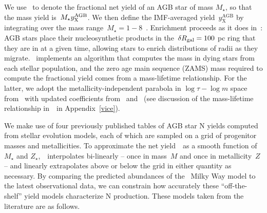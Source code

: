 We use~ to denote the fractional net yield of an AGB star of mass
$M_\star$, so that the mass yield is~$M_\star y_\text{X}^\text{AGB}$.
We then define the IMF-averaged yield~$y_\text{X}^\text{AGB}$ by integrating
over the mass range~$M_\star = 1 - 8$~\msun.
Enrichment proceeds as it does in~\citet{Johnson2021}: AGB stars place their
nucleosynthetic products in the~$\delta R_\text{gal} = 100$ pc ring that they are in at
a given time, allowing stars to enrich distributions of radii as they migrate.
\vice~implements an algorithm that computes the mass in dying stars
from each stellar population, and the zero age main sequence (ZAMS) mass
required to compute the fractional yield comes from a mass-lifetime
relationship. 
For the latter, we adopt the metallicity-independent parabola in
$\log\tau - \log m$ space from~\citet{Larson1974} with updated coefficients
from~\citet{Kobayashi2004} and~\citet*{David1990} (see discussion of the
mass-lifetime relationship in~\vice~in Appendix~\ref{vice}).
\par
We make use of four previously published tables of AGB star N yields
computed from stellar evolution models, each of which are sampled on a grid
of progenitor masses and metallicities.
To approximate the net yield~~as a smooth function of~$M_\star$ and
$Z_\star$,~\vice~interpolates bi-linearly -- once in mass~$M$ and once in
metallicity~$Z$ -- and linearly extrapolates above or below the grid in either
quantity as necessary.
By comparing the predicted abundances of the~\citet{Johnson2021} Milky Way
model to the latest observational data, we can constrain how accurately these
``off-the-shelf'' yield models characterize N production.
These models taken from the literature are as follows.

